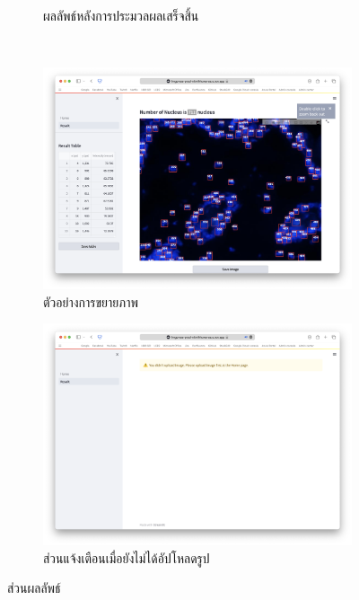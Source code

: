 \documentclass[12pt,oneside,openright,a4paper]{cpe-thai-project}
\begin{document}
\begin{figure}[!h]
\begin{subfigure}[b]{0.42\textwidth}
        \caption{ผลลัพธ์หลังการประมวลผลเสร็จสิ้น}\label{fig:web_result2}
    \end{subfigure}
    \\[1ex]
    \begin{subfigure}[b]{0.42\textwidth}
      \centering
        \includegraphics[width=\textwidth]{images/zoomable.png}
        \caption{ตัวอย่างการขยายภาพ}\label{fig:web_table}
    \end{subfigure}
    \begin{subfigure}[b]{0.42\textwidth}
      \centering
        \includegraphics[width=\textwidth]{images/non_upload.png}
        \caption{ส่วนแจ้งเตือนเมื่อยังไม่ได้อัปโหลดรูป}\label{fig:web_warnn}
    \end{subfigure}
    \caption{ส่วนผลลัพธ์}
    \label{fig:resuktweb}
\end{figure}
\pagebreak
\end{document}
